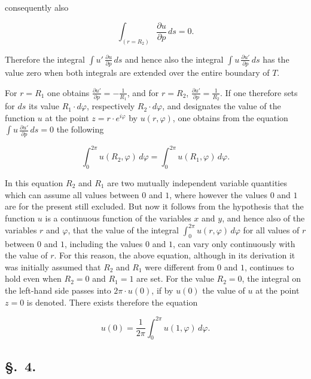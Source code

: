 \documentclass{article}
\begin{document}
consequently also

\[

\int_{(r = R_2)} \frac{\partial u}{\partial p}\,ds = 0.

\]

Therefore the integral $\displaystyle\int u'\,\frac{\partial u}{\partial p}\,ds$ and hence also the integral $\displaystyle\int u\,\frac{\partial u'}{\partial p}\,ds$ has the value zero when both integrals are extended over the entire boundary of $T$.



For $r = R_1$ one obtains $\frac{\partial u'}{\partial p} = -\frac{1}{R_1}$, and for $r = R_2$, $\frac{\partial u'}{\partial p} = \frac{1}{R_2}$. If one therefore sets for $ds$ its value $R_1 \cdot d\varphi$, respectively $R_2 \cdot d\varphi$, and designates the value of the function $u$ at the point $z = r \cdot e^{i\varphi}$ by $u(r, \varphi)$, one obtains from the equation $\displaystyle\int u\,\frac{\partial u'}{\partial p}\,ds = 0$ the following

\[

\int_0^{2\pi} u(R_2, \varphi)\,d\varphi = \int_0^{2\pi} u(R_1, \varphi)\,d\varphi.

\]



In this equation $R_2$ and $R_1$ are two mutually independent variable quantities which can assume all values between $0$ and $1$, where however the values $0$ and $1$ are for the present still excluded. But now it follows from the hypothesis that the function $u$ is a continuous function of the variables $x$ and $y$, and hence also of the variables $r$ and $\varphi$, that the value of the integral $\displaystyle\int_0^{2\pi} u(r, \varphi)\,d\varphi$ for all values of $r$ between $0$ and $1$, including the values $0$ and $1$, can vary only continuously with the value of $r$. For this reason, the above equation, although in its derivation it was initially assumed that $R_2$ and $R_1$ were different from $0$ and $1$, continues to hold even when $R_2 = 0$ and $R_1 = 1$ are set. For the value $R_2 = 0$, the integral on the left-hand side passes into $2\pi \cdot u(0)$, if by $u(0)$ the value of $u$ at the point $z = 0$ is denoted. There exists therefore the equation

\[

u(0) = \frac{1}{2\pi} \int_0^{2\pi} u(1, \varphi)\,d\varphi.

\]



\subsection*{§.~4.}
\end{document}

